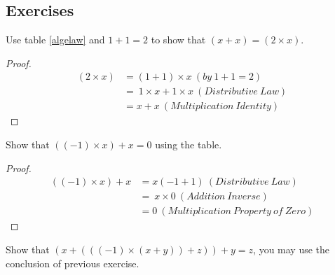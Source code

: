         \subsection{Exercises}
        \begin{exercise}
            Use table \ref{algelaw} and $1+1=2$ to show that $(x+x)=(2\times x)$.
        \end{exercise}
        \begin{proof}
            \begin{align*}
                ( 2\times x) & =( 1+1) \times x\ ( by\ 1+1=2)\\
                & =\ 1\times x+1\times x\ ( Distributive\ Law)\\
                & =x+x\ ( Multiplication\ Identity)
            \end{align*}
        \end{proof}
        \begin{exercise}
            Show that $((-1)\times x)+x=0$ using the table.
        \end{exercise}
        \begin{proof}
            \begin{align*}
                (( -1) \times x) +x & =x( -1+1) \ ( Distributive\ Law)\\
                 & =\ x\times 0\ ( Addition\ Inverse)\\
                 & =0\ ( Multiplication\ Property\ of\ Zero)
            \end{align*}
        \end{proof}
        \begin{exercise}
            Show that $(x+(((-1)\times (x+y))+z)) + y =z$, you may use the conclusion of previous
            exercise.
        \end{exercise}
